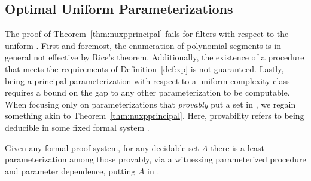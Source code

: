 \subsection{Optimal Uniform Parameterizations}
\label{sec:optimal_uniform_parameterizations}
The proof of Theorem~\ref{thm:nuxpprincipal} fails for filters with respect to the uniform .
First and foremost, the enumeration of polynomial segments is in general not effective by Rice's theorem.
Additionally, the existence of a procedure that meets the requirements of Definition~\ref{def:xp} is not guaranteed.
Lastly, being a principal parameterization with respect to a uniform complexity class requires a bound on the gap to any other parameterization to be computable.
When focusing only on parameterizations that \emph{provably} put a set in , we regain something akin to Theorem~\ref{thm:nuxpprincipal}.
Here, provability refers to being deducible in some fixed formal system \parencite{kleene1967mathematical}.
\begin{theorem}
\label{thm:xpprincipal}
  Given any formal proof system, for any decidable set $A$ there is a least parameterization among those provably, via a witnessing parameterized procedure and parameter dependence, putting $A$ in .
\end{theorem}
